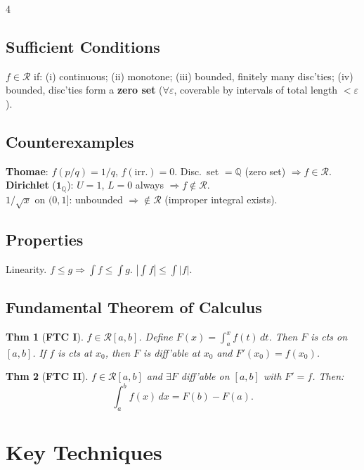 \documentclass[9pt,landscape]{extarticle}
\newcommand{\Q}{\mathbb{Q}}
\newcommand{\eps}{\varepsilon}
\theoremstyle{compact}
\newtheorem*{thm}{Thm}
\theoremstyle{defnstyle}
\begin{document}
\begin{multicols}{4}
\subsection{Sufficient Conditions}
$f \in \mathscr{R}$ if: (i) continuous; (ii) monotone; (iii) bounded, finitely many disc'ties; (iv) bounded, disc'ties form a \textbf{zero set} ($\forall\eps$, coverable by intervals of total length $<\eps$).

\subsection{Counterexamples}
\textbf{Thomae}: $f(p/q) = 1/q$, $f(\text{irr.})=0$. Disc.\ set $=\Q$ (zero set) $\Rightarrow f \in \mathscr{R}$.\\
\textbf{Dirichlet} ($\mathbf{1}_\Q$): $U=1$, $L=0$ always $\Rightarrow f \notin \mathscr{R}$.\\
$1/\sqrt{x}$ on $(0,1]$: unbounded $\Rightarrow \notin \mathscr{R}$ (improper integral exists).

\subsection{Properties}
Linearity. $f \leq g \Rightarrow \int f \leq \int g$. $|\int f| \leq \int|f|$.

\subsection{Fundamental Theorem of Calculus}
\begin{highlight}
\begin{thm}[\textbf{FTC I}]
$f \in \mathscr{R}[a,b]$. Define $F(x) = \int_a^x f(t)\,dt$. Then $F$ is cts on $[a,b]$. If $f$ is cts at $x_0$, then $F$ is diff'able at $x_0$ and $F'(x_0) = f(x_0)$.
\end{thm}
\begin{thm}[\textbf{FTC II}]
$f \in \mathscr{R}[a,b]$ and $\exists F$ diff'able on $[a,b]$ with $F' = f$. Then:
$$\int_a^b f(x)\,dx = F(b) - F(a).$$
\end{thm}
\end{highlight}

\section{Key Techniques}


\end{multicols}
\end{document}
